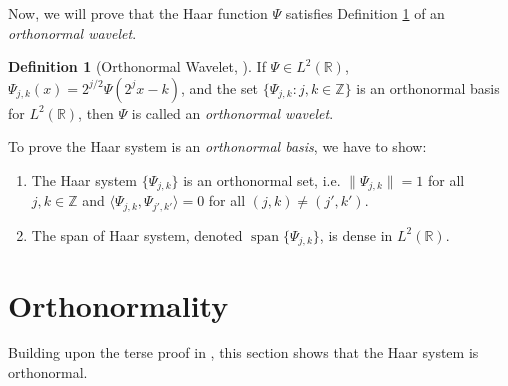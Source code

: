 \documentclass[11pt]{amsart}
\theoremstyle{theorem} %
\theoremstyle{definition}
\newtheorem{defn}[thm]{Definition}
\theoremstyle{example}
\theoremstyle{remark}
\numberwithin{equation}{section}
\newcommand{\R}{\mathbb{R}}
\newcommand{\Z}{\mathbb{Z}}
\DeclareMathOperator{\spn}{span}
\begin{document}
Now, we will prove that the Haar function $ \varPsi $ satisfies Definition \ref{def:wavelet} of an \emph{orthonormal wavelet}.

\begin{defn}[Orthonormal Wavelet, {\cite[303]{pinsky}}] \label{def:wavelet}
	If $ \varPsi \in L^2(\R) $, $ \varPsi_{j,k}(x) = 2^{j/2} \varPsi (2^j x-k) $, and the set $ \{ \varPsi_{j,k}: j,k \in \Z \} $ is an orthonormal basis for $ L^2(\R) $, then $ \varPsi $ is called an \emph{orthonormal wavelet}.
\end{defn}

To prove the Haar system is an \textit{orthonormal basis}, we have to show:
	\begin{enumerate}
		\item The Haar system $ \{ \varPsi_{j,k} \} $ is an orthonormal set, i.e. $ \| \varPsi_{j,k} \| = 1 $ for all $ j,k \in \Z $ and $ \langle \varPsi_{j,k}, \varPsi_{j',k'} \rangle = 0 $ for all $ (j,k) \neq (j',k') $.
		
		\item The span of Haar system, denoted $ \spn\{\varPsi_{j,k}\} $, is dense in $ L^2(\R) $.
	\end{enumerate}

\section{Orthonormality} \label{section:orthonormality}
Building upon the terse proof in  \cite{davidson}, this section shows that the Haar system is orthonormal.
\end{document}
